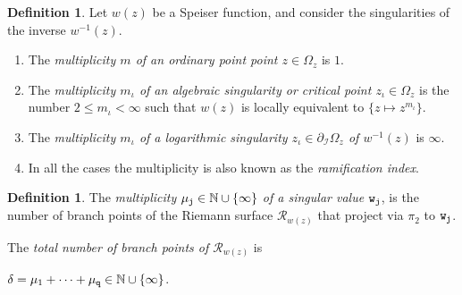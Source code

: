 \documentclass[final,3p,times]{elsarticle}
\newcommand{\NN}{\ensuremath{{\mathbb N}}}
\newcommand{\R}{\ensuremath{{\mathcal R}}}
\theoremstyle{definition}
\newtheorem{definition}[theorem]{Definition}
\begin{document}
\begin{definition}
\label{def:multiplicity-of-sing-point}
Let $w(z)$ be a Speiser function, and consider the singularities of the inverse $w^{-1}(z)$.
\begin{enumerate}[label=\arabic*),leftmargin=*] 
\item 
The 
\emph{multiplicity $m$ of an ordinary point point $z \in \Omega_z$} is $1$. 

\item
The 
\emph{multiplicity $m_\iota$ of an algebraic singularity or critical point 
$z_\iota \in \Omega_z$}
is the number $ 2 \leq m_\iota < \infty$ such that 
$w(z)$ is locally equivalent to $\{z \mapsto z^{m_\iota} \}$.

\item
The \emph{multiplicity $m_\iota$ of a logarithmic singularity 
$z_\iota\in \partial_{\mathcal{I}} \Omega_z$ of $w^{-1}(z)$}
is $\infty$.

\item
In all the cases the multiplicity is 
also known as the \emph{ramification index}.
\end{enumerate}
\end{definition}


\begin{definition}
\label{def:multiplicity-of-sing-values}
The 
\emph{multiplicity $\mu_{\tt j} \in \NN \cup \{ \infty\}$
of a singular value ${\tt w}_{\tt j}$},
is the number of branch points of 
the Riemann surface $\R_{w(z)}$ that 
project via $\pi_2$ to ${\tt w}_{\tt j}$.

\noindent 
The \emph{total number of branch points of $\R_{w(z)}$} is
\vspace{0.1cm}

\centerline{$\delta = \mu_{1 }+  \cdots + \mu_{\tt q}
\in \NN \cup \{ \infty \}$.}
\end{definition}
\end{document}
